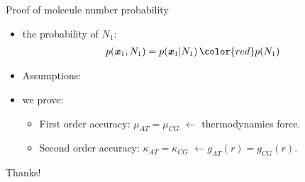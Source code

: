 \documentclass{beamer}
\newcommand{\redc}[1]{{\color{red} #1}}
\newcommand{\bluec}[1]{{\color{blue} #1}}
\renewcommand{\v}[1]{\textbf{\textit{#1}}}
\begin{document}
\begin{frame}{Proof of molecule number probability}
  \begin{itemize}
    \vfill
  \item <1-> the probability of $N_1$: 
    \begin{align*}
      p(\v x_1, N_1) = p(\v x_1 | N_1) \, \redc{p (N_1)}
    \end{align*}
    \vfill
  \item <2-> Assumptions:
    \vfill
    \vfill
  \item <3-> we prove:
    \vfill
    \begin{itemize}
    \item First order accuracy: \redc{$\mu_{AT} = \mu_{CG}$}
      $\leftarrow$ thermodynamics force.
    \vfill
  \item Second order accuracy: \redc{$\kappa_{AT} = \kappa_{CG}$}
    $\leftarrow g_{AT}(r) = g_{CG}(r)$.
    \end{itemize}
    \vfill
  \end{itemize}
\end{frame}

\begin{frame}
  \vfill
  \centerline{ \Huge
    Thanks!  }
  \vfill
\end{frame}
\end{document}
